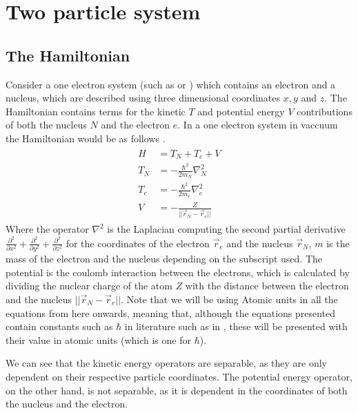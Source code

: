 \documentclass[../master_thesis.tex]{subfiles}
\begin{document}
\section{Two particle system}
\subsection{The Hamiltonian}
Consider a one electron system (such as  or ) which contains an
electron and a nucleus, which are described using three dimensional coordinates
$ x, y $ and $ z $. The Hamiltonian contains terms for the kinetic $T$ and
potential energy $V$ contributions of both the nucleus $ N $ and the electron
$ e $. In a one electron system in vaccuum the Hamiltonian would be as follows
\cite{Jensen:2017, Cramer:2004}.
\begin{align}
  \begin{split}
    H   &= T_N + T_e + V \\
    T_N &= -\frac{\hbar^2}{2m_N}\nabla^2_N \\
    T_e &= -\frac{\hbar^2}{2m_e}\nabla^2_e \\
    V   &= -\frac{Z}{||\vec{r}_N - \vec{r}_e||} \label{eq:twopH}
  \end{split}
\end{align}
Where the operator $ \nabla^2$ is the Laplacian computing the second partial
derivative $ \frac{\partial^2}{\partial x^2} + \frac{\partial^2}{\partial y^2} +
\frac{\partial^2}{\partial z^2} $ for the coordinates of the electron $\vec{r}_e$
and the nucleus $\vec{r}_N$, $ m $ is the mass of the electron and the nucleus
depending on the subscript used. The potential is the coulomb interaction
between the electrons, which is calculated by dividing the nuclear charge of the
atom $ Z $ with the distance between the electron and the nucleus
$ ||\vec{r}_N - \vec{r}_e|| $. Note that we will be using Atomic units in all
the equations from here onwards, meaning that, although the equations presented
contain constants such as $\hbar$ in literature such as in \cite{Atkins:2014},
these will be presented with their value in atomic units (which is one for
$\hbar$).

We can see that the kinetic energy operators are separable, as they are only
dependent on their respective particle coordinates. The potential energy
operator, on the other hand, is not separable, as it is dependent in the
coordinates of both the nucleus and the electron.
\end{document}
